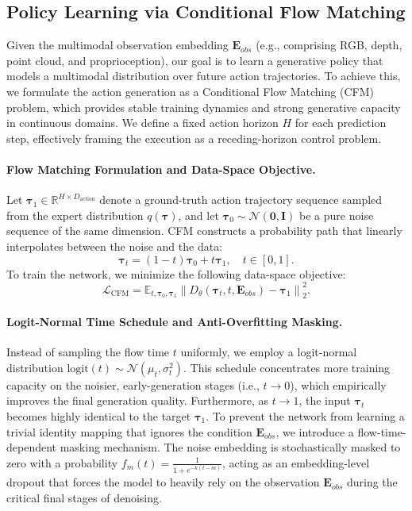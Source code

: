 \subsection{Policy Learning via Conditional Flow Matching}
Given the multimodal observation embedding $\mathbf{E}_{obs}$ (e.g., comprising RGB, depth, point cloud, and proprioception), our goal is to learn a generative policy that models a multimodal distribution over future action trajectories. To achieve this, we formulate the action generation as a Conditional Flow Matching (CFM) problem, which provides stable training dynamics and strong generative capacity in continuous domains. We define a fixed action horizon $H$ for each prediction step, effectively framing the execution as a receding-horizon control problem.

\paragraph{Flow Matching Formulation and Data-Space Objective.} 
Let $\boldsymbol{\tau}_1 \in \mathbb{R}^{H \times D_{\text{action}}}$ denote a ground-truth action trajectory sequence sampled from the expert distribution $q(\boldsymbol{\tau})$, and let $\boldsymbol{\tau}_0 \sim \mathcal{N}(\mathbf{0}, \mathbf{I})$ be a pure noise sequence of the same dimension. CFM constructs a probability path that linearly interpolates between the noise and the data:
\begin{equation}
    \boldsymbol{\tau}_t = (1 - t)\boldsymbol{\tau}_0 + t\boldsymbol{\tau}_1, \quad t \in [0,1].
\end{equation}
To train the network, we minimize the following data-space objective:
\begin{equation}
    \mathcal{L}_{\text{CFM}} = \mathbb{E}_{t, \boldsymbol{\tau}_0, \boldsymbol{\tau}_1} \left\| D_\theta(\boldsymbol{\tau}_t, t, \mathbf{E}_{obs}) - \boldsymbol{\tau}_1 \right\|^2_2.
\end{equation}

\paragraph{Logit-Normal Time Schedule and Anti-Overfitting Masking.} 
Instead of sampling the flow time $t$ uniformly, we employ a logit-normal distribution $\text{logit}(t) \sim \mathcal{N}(\mu_t, \sigma_t^2)$. This schedule concentrates more training capacity on the noisier, early-generation stages (i.e., $t \to 0$), which empirically improves the final generation quality. Furthermore, as $t \to 1$, the input $\boldsymbol{\tau}_t$ becomes highly identical to the target $\boldsymbol{\tau}_1$. To prevent the network from learning a trivial identity mapping that ignores the condition $\mathbf{E}_{obs}$, we introduce a flow-time-dependent masking mechanism. The noise embedding is stochastically masked to zero with a probability $f_m(t) = \frac{1}{1+e^{-k(t-m)}}$, acting as an embedding-level dropout that forces the model to heavily rely on the observation $\mathbf{E}_{obs}$ during the critical final stages of denoising.


